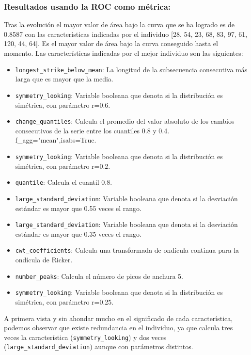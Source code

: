 \documentclass[a4paper,12pt,twoside,oldfontcommands]{memoir}
\begin{document}
	\subsubsection{Resultados usando la ROC como métrica:} 
	
	Tras la evolución el mayor valor de área bajo la curva que se ha logrado es de 0.8587 con las características indicadas por el individuo [28, 54, 23, 68, 83, 97, 61, 120, 44, 64]. Es el mayor valor de área bajo la curva conseguido hasta el momento. Las características indicadas por el mejor individuo son las siguientes: 
	\begin{itemize}
		\item \texttt{longest\_strike\_below\_mean}: La longitud de la subsecuencia consecutiva más larga que es mayor que la media. 
		\item \texttt{symmetry\_looking}: Variable booleana que denota si la distribución es simétrica, con parámetro r=0.6. 
		\item \texttt{change\_quantiles}: Calcula el promedio del valor absoluto de los cambios consecutivos de la serie entre los cuantiles 0.8 y 0.4. f\_agg="mean",isabs=True.
		\item \texttt{symmetry\_looking}: Variable booleana que denota si la distribución es simétrica, con parámetro r=0.2.
		\item \texttt{quantile}: Calcula el cuantil 0.8. 
		\item \texttt{large\_standard\_deviation}: Variable booleana que denota si la desviación estándar es mayor que 0.55 veces el rango.
		\item \texttt{large\_standard\_deviation}: Variable booleana que denota si la desviación estándar es mayor que 0.35 veces el rango. 
		\item \texttt{cwt\_coefficients}: Calcula una transformada de ondícula continua para la ondícula de Ricker. 
		\item \texttt{number\_peaks}: Calcula el número de picos de anchura 5. 
		\item \texttt{symmetry\_looking}: Variable booleana que denota si la distribución es simétrica, con parámetro r=0.25.
	\end{itemize}
	
	A primera vista y sin ahondar mucho en el significado de cada característica, podemos observar que existe redundancia en el individuo, ya que calcula tres veces la característica (\texttt{symmetry\_looking}) y dos veces (\texttt{large\_standard\_deviation}) aunque con parámetros distintos. 
	
\end{document}
